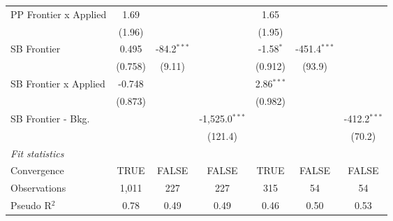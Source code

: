 \begin{tabular}{lcccccc}
   PP Frontier x Applied        & 1.69    &               &                  & 1.65         &                &   \\   
                                & (1.96)  &               &                  & (1.95)       &                &   \\   
   SB Frontier                  & 0.495   & -84.2$^{***}$ &                  & -1.58$^{*}$  & -451.4$^{***}$ &   \\   
                                & (0.758) & (9.11)        &                  & (0.912)      & (93.9)         &   \\   
   SB Frontier x Applied        & -0.748  &               &                  & 2.86$^{***}$ &                &   \\   
                                & (0.873) &               &                  & (0.982)      &                &   \\   
   SB Frontier - Bkg.           &         &               & -1,525.0$^{***}$ &              &                & -412.2$^{***}$\\   
                                &         &               & (121.4)          &              &                & (70.2)\\   
   \midrule
   \emph{Fit statistics}\\
   Convergence                  &TRUE     & FALSE         & FALSE            & TRUE         & FALSE          & FALSE\\  
   Observations                 & 1,011   & 227           & 227              & 315          & 54             & 54\\  
   Pseudo R$^2$                 & 0.78    & 0.49          & 0.49             & 0.46         & 0.50           & 0.53\\  
   

\end{tabular}
